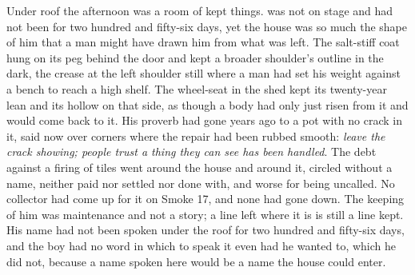Under  roof the afternoon was a room of kept things.  was not on stage and had not been for two hundred and fifty-six days, yet the house was so much the shape of him that a man might have drawn him from what was left. The salt-stiff coat hung on its peg behind the door and kept a broader shoulder's outline in the dark, the crease at the left shoulder still where a man had set his weight against a bench to reach a high shelf. The wheel-seat in the shed kept its twenty-year lean and its hollow on that side, as though a body had only just risen from it and would come back to it. His proverb had gone years ago to a pot with no crack in it, said now over corners where the repair had been rubbed smooth: \emph{leave the crack showing; people trust a thing they can see has been handled}. The debt against a firing of tiles went around the house and around it, circled without a name, neither paid nor settled nor done with, and worse for being uncalled. No collector had come up  for it on Smoke 17, and none had gone down. The keeping of him was maintenance and not a story; a line left where it is is still a line kept. His name had not been spoken under the roof for two hundred and fifty-six days, and the boy had no word in which to speak it even had he wanted to, which he did not, because a name spoken here would be a name the house could enter.

